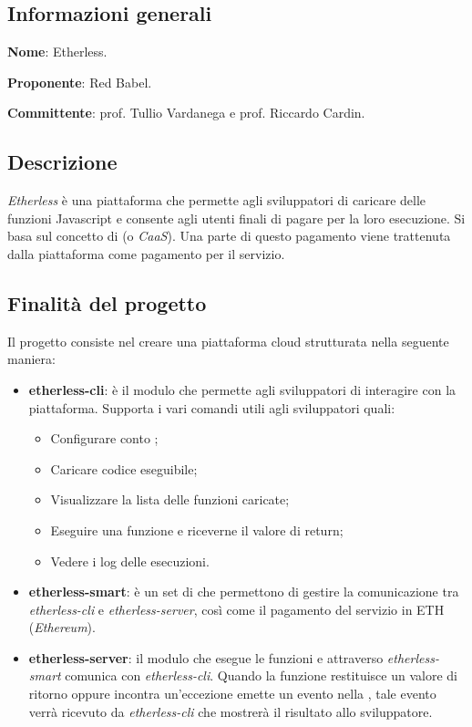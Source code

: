 \documentclass[../studio-di-fattibilita.tex]{subfiles}
\begin{document}
\subsection{Informazioni generali}%
\label{sub:informazioni_generale}
\begin{description}
  \item \textbf{Nome}: Etherless.
  \item \textbf{Proponente}: Red Babel.
  \item \textbf{Committente}: prof. Tullio Vardanega e prof. Riccardo Cardin.
\end{description}

\subsection{Descrizione}%
\label{sub:descrizione}
\textit{Etherless} è una piattaforma  che permette agli sviluppatori di caricare delle funzioni Javascript e consente
agli utenti finali di pagare per la loro esecuzione. Si basa sul concetto di  (o \textit{CaaS}).
Una parte di questo pagamento viene trattenuta dalla piattaforma come pagamento per il servizio.

\subsection{Finalità del progetto}%
\label{sub:finalita_del_progetto}
Il progetto consiste nel creare una piattaforma cloud strutturata nella seguente maniera:
\begin{itemize}
  \item \textbf{etherless-cli}: è il modulo che permette agli sviluppatori di interagire con la piattaforma.
  Supporta i vari comandi utili agli sviluppatori quali:
  \begin{itemize}
    \item Configurare conto ;
    \item Caricare codice eseguibile;
    \item Visualizzare la lista delle funzioni caricate;
    \item Eseguire una funzione e riceverne il valore di return;
    \item Vedere i log delle esecuzioni.
  \end{itemize}
  \item \textbf{etherless-smart}: è un set di  che permettono di gestire la comunicazione tra
        \textit{etherless-cli} e \textit{etherless-server}, così come il pagamento del servizio in ETH (\textit{Ethereum}).
  \item \textbf{etherless-server}: il modulo che esegue le funzioni e attraverso \textit{etherless-smart} comunica
        con \textit{etherless-cli}. Quando la funzione restituisce un valore di ritorno oppure incontra un'eccezione
        emette un evento nella , tale evento verrà ricevuto da \textit{etherless-cli} che mostrerà il risultato
        allo sviluppatore.
\end{itemize}
\end{document}

